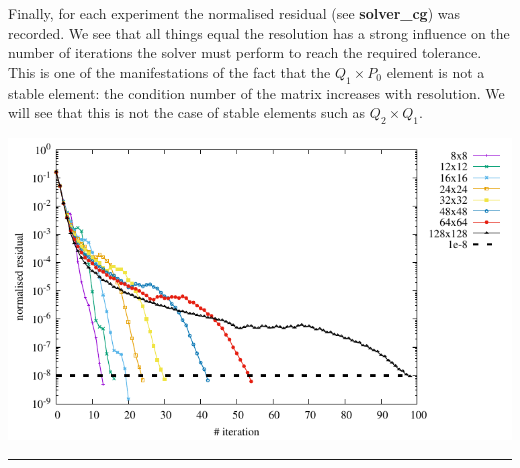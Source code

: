 Finally, for each experiment the normalised residual (see {\bf solver\_cg}) was recorded. We see that 
all things equal the resolution has a strong influence on the number of iterations the solver must
perform to reach the required tolerance. This is one of the manifestations of the fact that the 
$Q_1 \times P_0$ element is not a stable element: the condition number of the matrix increases with 
resolution. We will see that this is not the case of stable elements such as $Q_2\times Q_1$.

\begin{center}
\includegraphics[width=14cm]{python_codes/fieldstone_15/results/residual.pdf}
\end{center}

\par\noindent\rule{\textwidth}{0.4pt}

\vspace{.5cm}

\begin{center}
\end{center}
